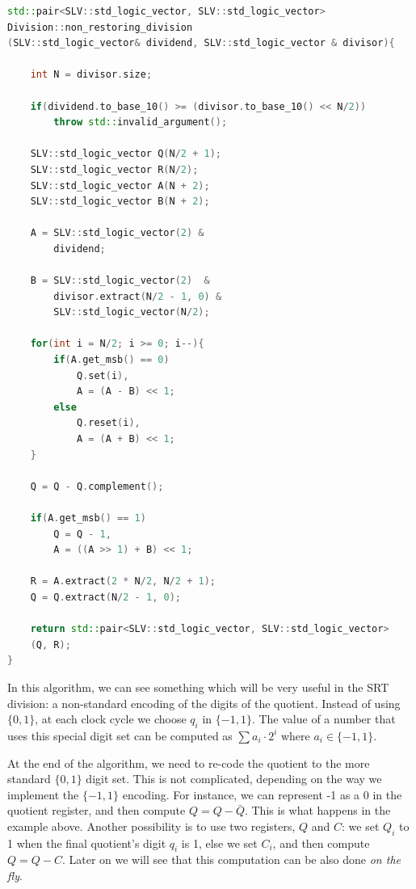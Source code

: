 \begin{lstlisting}[language=C++]
std::pair<SLV::std_logic_vector, SLV::std_logic_vector> 
Division::non_restoring_division
(SLV::std_logic_vector& dividend, SLV::std_logic_vector & divisor){
    
    int N = divisor.size;

    if(dividend.to_base_10() >= (divisor.to_base_10() << N/2))
        throw std::invalid_argument();    

    SLV::std_logic_vector Q(N/2 + 1);
    SLV::std_logic_vector R(N/2);
    SLV::std_logic_vector A(N + 2);
    SLV::std_logic_vector B(N + 2);

    A = SLV::std_logic_vector(2) &
        dividend;
    
    B = SLV::std_logic_vector(2)  & 
        divisor.extract(N/2 - 1, 0) &
        SLV::std_logic_vector(N/2);

    for(int i = N/2; i >= 0; i--){
        if(A.get_msb() == 0)
            Q.set(i),
            A = (A - B) << 1;
        else
            Q.reset(i),
            A = (A + B) << 1;
    }

    Q = Q - Q.complement();

    if(A.get_msb() == 1)
        Q = Q - 1,
        A = ((A >> 1) + B) << 1;

    R = A.extract(2 * N/2, N/2 + 1);
    Q = Q.extract(N/2 - 1, 0); 

    return std::pair<SLV::std_logic_vector, SLV::std_logic_vector>
    (Q, R);
}
\end{lstlisting}

In this algorithm, we can see something which will be very useful in the SRT division: a non-standard encoding of the digits of the quotient. 
Instead of using $\{0, 1\}$, at each clock cycle we choose $q_i$ in $\{-1, 1\}$. 
The value of a number that uses this special digit set can be computed as $\sum a_i \cdot 2^i$ where $a_i \in \{-1, 1\}$.

At the end of the algorithm, we need to re-code the quotient to the more standard $\{0, 1\}$ digit set. 
This is not complicated, depending on the way we implement the $\{-1, 1\}$ encoding.
For instance, we can represent -1 as a 0 in the quotient register, and then compute $Q = Q - \bar{Q}$. 
This is what happens in the example above.
Another possibility is to use two registers, $Q$ and $C$: we set $Q_i$ to 1 when the final quotient's digit $q_i$ is 1, else we set $C_i$, and then compute $Q = Q - C$.
Later on we will see that this computation can be also done \textit{on the fly}.

